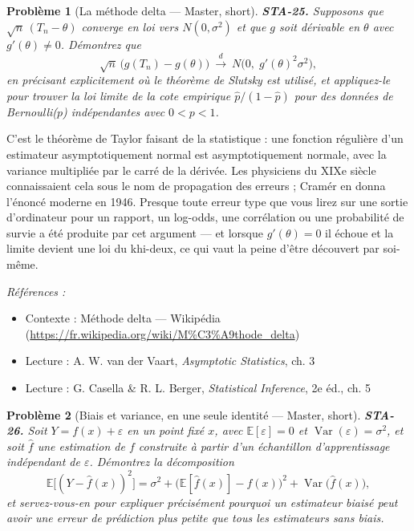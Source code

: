 \documentclass[11pt]{article}
\newtheorem{problem}{Problème}
\newenvironment{refs}{\par\small\noindent\emph{Références :}\begin{itemize}\setlength\itemsep{0pt}}{\end{itemize}\normalsize}
\begin{document}
\bigskip

\begin{problem}[{La méthode delta --- Master, short}]
\textbf{STA-25.} Supposons que $ \sqrt{n}\,(T_n - \theta) $ converge en loi
vers $ N(0, \sigma^2) $ et que $ g $ soit dérivable en $ \theta $ avec
$ g'(\theta) \ne 0 $. Démontrez que
\[ \sqrt{n}\,\big( g(T_n) - g(\theta) \big) \ \xrightarrow{\ d\ } \
 N\!\big(0,\; g'(\theta)^2 \sigma^2\big) , \]
en précisant explicitement où le théorème de Slutsky est utilisé, et appliquez-le pour trouver la
loi limite de la cote empirique $ \hat{p}/(1-\hat{p}) $ pour des données de Bernoulli($ p $)
indépendantes avec $ 0 <p <1 $.
\end{problem}

\noindent C'est le théorème de Taylor faisant de la statistique : une fonction régulière
d'un estimateur asymptotiquement normal est asymptotiquement normale, avec la variance multipliée
par le carré de la dérivée. Les physiciens du XIXe siècle connaissaient cela sous le nom
de propagation des erreurs ; Cramér en donna l'énoncé moderne en 1946. Presque toute erreur type
que vous lirez sur une sortie d'ordinateur pour un rapport, un log-odds, une corrélation ou une
probabilité de survie a été produite par cet argument --- et lorsque $ g'(\theta) = 0 $ il échoue
et la limite devient une loi du khi-deux, ce qui vaut la peine d'être découvert par soi-même.

\begin{refs}
\item Contexte : Méthode delta --- Wikipédia (\url{https://fr.wikipedia.org/wiki/M%C3%A9thode_delta})
\item Lecture : A. W. van der Vaart, \textit{Asymptotic Statistics}, ch. 3
\item Lecture : G. Casella \& R. L. Berger, \textit{Statistical Inference}, 2e éd., ch. 5
\end{refs}

\bigskip

\begin{problem}[{Biais et variance, en une seule identité --- Master, short}]
\textbf{STA-26.} Soit $ Y = f(x) + \varepsilon $ en un point fixé $ x $,
avec $ \mathbb{E}[\varepsilon] = 0 $ et $ \operatorname{Var}(\varepsilon) = \sigma^2 $, et soit
$ \hat{f} $ une estimation de $ f $ construite à partir d'un échantillon d'apprentissage
indépendant de $ \varepsilon $. Démontrez la décomposition
\[ \mathbb{E}\big[(Y - \hat{f}(x))^2\big] = \sigma^2
 + \big( \mathbb{E}[\hat{f}(x)] - f(x) \big)^2 + \operatorname{Var}\big(\hat{f}(x)\big) , \]
et servez-vous-en pour expliquer précisément pourquoi un estimateur biaisé peut avoir une erreur de
prédiction plus petite que tous les estimateurs sans biais.
\end{problem}
\end{document}
